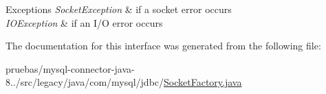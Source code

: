 \begin{DoxyExceptions}{Exceptions}
{\em Socket\+Exception} & if a socket error occurs \\
\hline
{\em I\+O\+Exception} & if an I/O error occurs \\
\hline
\end{DoxyExceptions}


The documentation for this interface was generated from the following file\+:\begin{DoxyCompactItemize}
\item 
pruebas/mysql-\/connector-\/java-\/8../src/legacy/java/com/mysql/jdbc/\mbox{\hyperlink{legacy_2java_2com_2mysql_2jdbc_2_socket_factory_8java}{Socket\+Factory.\+java}}\end{DoxyCompactItemize}
